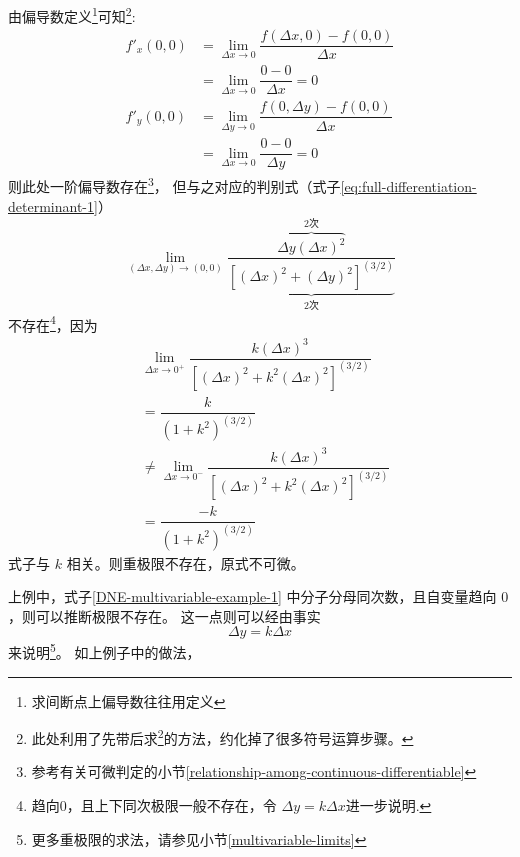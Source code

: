\begin{example}
    由偏导数定义\footnote{求间断点上偏导数往往用定义}可知\footnote{此处利用了先带后求\footnote{参见小节\ref{partial-deverative}}的方法，约化掉了很多符号运算步骤。}:
    \begin{align*}
        f'_x(0, 0) &= \lim_{\Delta x \to 0} \dfrac{f(\Delta x, 0) - f(0, 0)}{\Delta x} \\ 
                   &= \lim_{\Delta x \to 0} \dfrac{0-0}{\Delta x} = 0\\
        f'_y(0, 0) &= \lim_{\Delta y \to 0} \dfrac{f(0, \Delta y) - f(0, 0)}{\Delta x} \\ 
                   &= \lim_{\Delta x \to 0} \dfrac{0-0}{\Delta y} = 0
    \end{align*}
    则此处一阶偏导数存在\footnote{参考有关可微判定的小节\ref{relationship-among-continuous-differentiable}}，
    但与之对应的判别式（式子\ref{eq:full-differentiation-determinant-1}）
    \begin{equation}
        \label{DNE-multivariable-example-1}
        \lim_{(\Delta x, \Delta y) \to (0,0)} \dfrac{\overbrace{\Delta y (\Delta x)^2}^{2 \mbox{次}}}{\underbrace{[(\Delta x)^2 + (\Delta y)^2]^{(3/2)}}_{2 \mbox{次}}}
    \end{equation}
    不存在\footnote{趋向0，且上下同次极限一般不存在，令 $\Delta y = k \Delta x$进一步说明.}，因为
    \begin{align*}
          &\lim_{\Delta x \to 0^+} \dfrac{k(\Delta x)^3}{[(\Delta x)^2 + k^2 (\Delta x)^2]^{(3/2)}}  \\
          &= \dfrac{k}{(1 + k^2)^{(3/2)}} \\
          &\neq \lim_{\Delta x \to 0^-} \dfrac{k(\Delta x)^3}{[(\Delta x)^2 + k^2 (\Delta x)^2]^{(3/2)}}  \\
          &= \dfrac{-k}{(1 + k^2)^{(3/2)}}
    \end{align*}
    式子与 $k$ 相关。则重极限不存在，原式不可微。
\end{example}

上例中，式子\ref{DNE-multivariable-example-1} 中分子分母同次数，且自变量趋向 $0$，则可以推断极限不存在。
这一点则可以经由事实
\[
    \Delta y = k \Delta x
\]
来说明\footnote{更多重极限的求法，请参见小节\ref{multivariable-limits}}。
如上例子中的做法，

